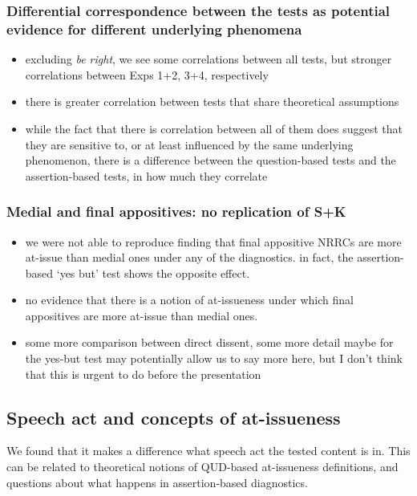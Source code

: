 \documentclass[times,linguex,xcolor]{glossa}
\begin{document}
    \subsubsection{Differential correspondence between the tests as potential evidence for different underlying phenomena}
      \begin{itemize}
        \item excluding \emph{be right}, we see some correlations between all tests, but stronger correlations between Exps 1+2, 3+4, respectively

        \item there is greater correlation between tests that share theoretical assumptions

        \item while the fact that there is correlation between all of them does suggest that they are sensitive to, or at least influenced by the same underlying phenomenon, there is a difference between the question-based tests and the assertion-based tests, in how much they correlate

      \end{itemize}



  \subsubsection{Medial and final appositives: no replication of S+K}
    \begin{itemize}
      \item we were not  able to reproduce  finding that final appositive NRRCs are more at-issue than medial ones under any of the diagnostics. in fact, the assertion-based `yes but' test shows the opposite effect.
      \item no evidence that there is a notion of at-issueness under which final appositives are more at-issue than medial ones.
      \item some more comparison between direct dissent, some more detail maybe for the yes-but test may potentially allow us to say more here, but I don't think that this is urgent to do before the presentation
    \end{itemize}

  \subsection{Speech act and concepts of at-issueness}
    We found that it makes a difference what speech act the tested content is in. This can be related to theoretical notions of QUD-based at-issueness definitions, and questions about what happens in assertion-based diagnostics.
\end{document}
